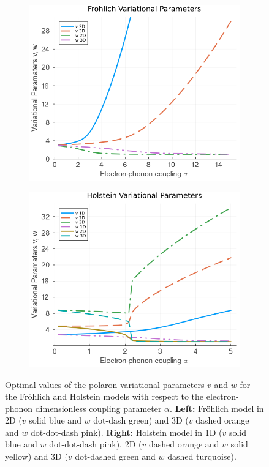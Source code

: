 \begin{figure}
  \begin{subfigure}[b]{0.49\textwidth}
    \includegraphics[width=\textwidth]{figures/vw_alpha_fro.png}
  \end{subfigure}
  \hfill
  \begin{subfigure}[b]{0.49\textwidth}
    \includegraphics[width=\textwidth]{figures/vw_alpha_hol.png}
  \end{subfigure}
  \caption{Optimal values of the polaron variational parameters $v$ and $w$ for the Fr\"ohlich and Holstein models with respect to the electron-phonon dimensionless coupling parameter $\alpha$. \textbf{Left:} Fr\"ohlich model in 2D ($v$ solid blue and $w$ dot-dash green) and 3D ($v$ dashed orange and $w$ dot-dot-dash pink). \textbf{Right:} Holstein model in 1D ($v$ solid blue and $w$ dot-dot-dash pink), 2D ($v$ dashed orange and $w$ solid yellow) and 3D ($v$ dot-dashed green and $w$ dashed turquoise).}
  \label{fig:vw_alpha}
\end{figure}

